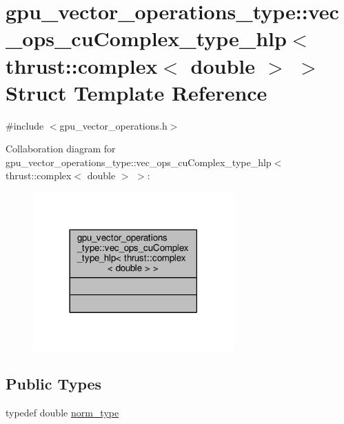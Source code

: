 \hypertarget{structgpu__vector__operations__type_1_1vec__ops__cuComplex__type__hlp_3_01thrust_1_1complex_3_01double_01_4_01_4}{\section{gpu\-\_\-vector\-\_\-operations\-\_\-type\-:\-:vec\-\_\-ops\-\_\-cu\-Complex\-\_\-type\-\_\-hlp$<$ thrust\-:\-:complex$<$ double $>$ $>$ Struct Template Reference}
\label{structgpu__vector__operations__type_1_1vec__ops__cuComplex__type__hlp_3_01thrust_1_1complex_3_01double_01_4_01_4}
}


{\ttfamily \#include $<$gpu\-\_\-vector\-\_\-operations.\-h$>$}



Collaboration diagram for gpu\-\_\-vector\-\_\-operations\-\_\-type\-:\-:vec\-\_\-ops\-\_\-cu\-Complex\-\_\-type\-\_\-hlp$<$ thrust\-:\-:complex$<$ double $>$ $>$\-:\nopagebreak
\begin{figure}[H]
\begin{center}
\leavevmode
\includegraphics[width=218pt]{structgpu__vector__operations__type_1_1vec__ops__cuComplex__type__hlp_3_01thrust_1_1complex_3_01double_01_4_01_4__coll__graph}
\end{center}
\end{figure}
\subsection*{Public Types}
\begin{DoxyCompactItemize}
\item 
typedef double \hyperlink{structgpu__vector__operations__type_1_1vec__ops__cuComplex__type__hlp_3_01thrust_1_1complex_3_01double_01_4_01_4_a39900bbd4d214f56f565eba71c33bce0}{norm\-\_\-type}
\end{DoxyCompactItemize}


